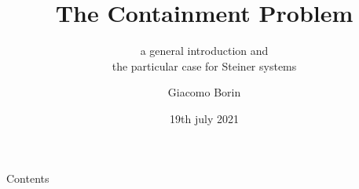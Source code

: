 \documentclass{beamer}
\title{The Containment Problem}
\subtitle{a general introduction and 
\\the particular case for Steiner systems}
\author{Giacomo Borin}
\institute{Università di Trento}
\date{19th july 2021}
\begin{document}
\begin{frame}
  \titlepage
\end{frame}

\begin{frame}{Contents}
  \tableofcontents
\end{frame}
\end{document}
